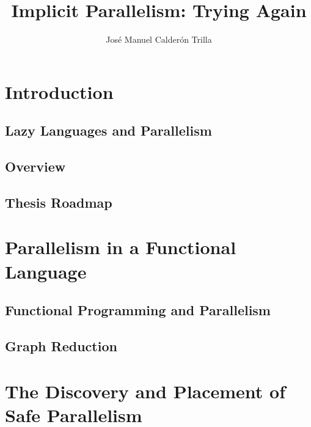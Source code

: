 \documentclass[justified, twoside, a4paper, symmetric]{tufte-book}
\title{Implicit Parallelism: Trying Again}
\author{Jos\'{e} Manuel Calder\'{o}n Trilla}
\newcommand{\blankpage}{\newpage\hbox{}\thispagestyle{empty}\newpage}
\begin{document}
\frontmatter


\maketitle

\tableofcontents
\listoffigures
\listoftables

\chapter{Introduction}

    
    
    \section{Lazy Languages and Parallelism}
    

    \section{Overview}
    

    \section{Thesis Roadmap}

\chapter{Parallelism in a Functional Language}

    

    \section{Functional Programming and Parallelism}
    
    
    \section{Graph Reduction}
    

\chapter{The Discovery and Placement of Safe Parallelism}
\end{document}
